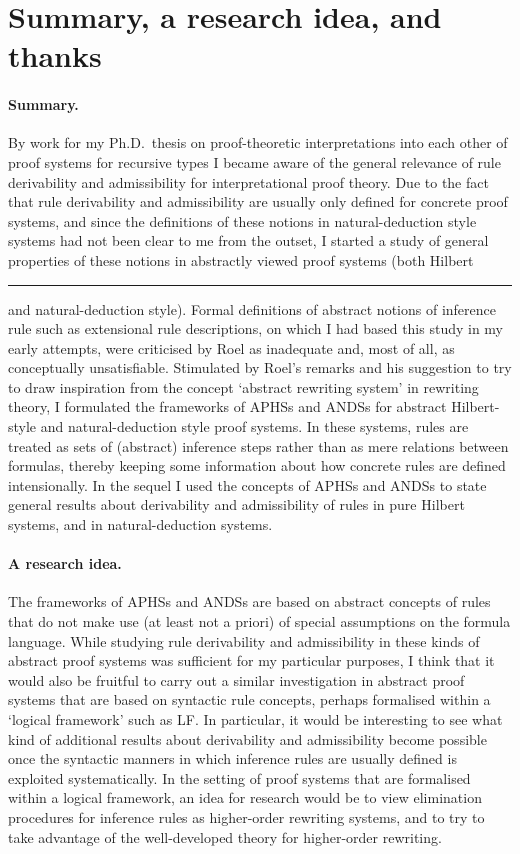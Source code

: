\documentclass[envcountsame,runningheads]{llncs}
\newcommand{\APHS}{A\hspace*{-0.3pt}P\hspace*{-0.6pt}H\hspace*{-0.4pt}S}
\newcommand{\ANDS}{ANDS}
\begin{document}
\section{Summary, a research idea, and thanks}
  \label{sec:conclusion}


\paragraph{Summary.}
By work for my Ph.D.~thesis on proof-theoretic interpretations into each other 
of proof systems for recursive types I became aware of the general relevance
of rule derivability and admissibility for interpretational proof theory. 
Due to the fact that rule derivability and admissibility are usually only
defined for concrete proof systems, and since the definitions of these
notions in natural-deduction style systems had not been clear to me
from the outset, I started a study of general properties of these notions
in abstractly viewed proof systems (both Hilbert\rule{1pt}{0pt} 
and natural-deduction style).
Formal definitions of abstract notions of inference rule
such as extensional rule descriptions, on which I had based
this study in my early attempts, 
were criticised by Roel as inadequate and, most of all, as conceptually 
unsatisfiable. 
Stimulated by Roel's remarks and his suggestion to try to draw inspiration from
the concept `abstract rewriting system' in rewriting theory,
I formulated the frameworks of \APHS{s} and \ANDS{s} for
abstract Hilbert-style and natural-deduction style proof systems.
In these systems, rules  
are treated as sets of (abstract) inference steps rather than
as mere relations between formulas, thereby keeping 
some information about how concrete rules are defined intensionally. 
In the sequel I used the concepts of \APHS{s} and \ANDS{s} to
state general results about derivability and admissibility of rules 
in pure Hilbert systems, and in natural-deduction systems.

\paragraph{A research idea.}
The frameworks of \APHS{s} and \ANDS{s} are based on abstract concepts of rules
that do not make use (at least not a priori) of special assumptions
on the formula language. 
While studying rule derivability and admissibility in these kinds
of abstract proof systems was sufficient for my particular purposes,
I think that it would also be fruitful to carry out a similar investigation
in abstract proof systems that are based on syntactic rule concepts,
perhaps 
formalised within a `logical framework' such as LF.
In particular, it would be interesting to see what kind of additional results 
about derivability and admissibility become possible 
once the syntactic manners in which inference rules are usually
defined is exploited systematically.
In the setting of proof systems that are formalised within a logical framework,
an idea for research would be to view elimination procedures for inference rules 
as higher-order rewriting systems, and to try to take advantage of 
the well-developed theory for higher-order rewriting. 
\end{document}

